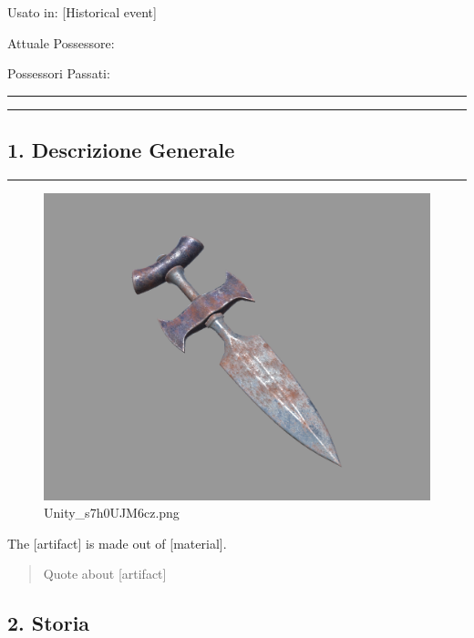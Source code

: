 Usato in: {[}Historical event{]}

Attuale Possessore:

Possessori Passati:

\begin{center}\rule{0.5\linewidth}{0.5pt}\end{center}

\begin{center}\rule{0.5\linewidth}{0.5pt}\end{center}

\subsection{1. Descrizione Generale}\label{descrizione-generale}

\begin{center}\rule{0.5\linewidth}{0.5pt}\end{center}

\begin{figure}
\centering
\includegraphics{Unity_s7h0UJM6cz.png}
\caption{Unity\_s7h0UJM6cz.png}
\end{figure}

The {[}artifact{]} is made out of {[}material{]}.

\begin{quote}
Quote about {[}artifact{]}
\end{quote}

\subsection{2. Storia}\label{storia}

